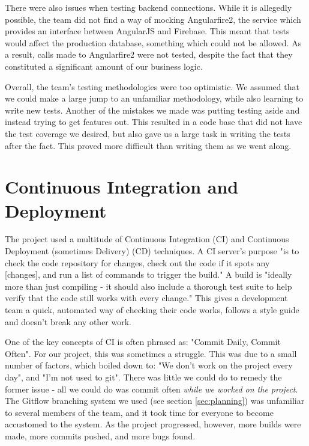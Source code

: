 \documentclass{l3proj}
\begin{document}
There were also issues when testing backend connections. While it is
 allegedly possible, the team did not find a way of mocking Angularfire2, the
 service which provides an interface between AngularJS and Firebase. This meant
 that tests would affect the production database, something which could not be
 allowed. As a result, calls made to Angularfire2 were not tested, despite the
 fact that they constituted a significant amount of our business logic.

Overall, the team's testing methodologies were too optimistic. We assumed that
 we could make a large jump to an unfamiliar methodology, while also learning
 to write new tests. Another of the mistakes we made was putting testing aside
 and instead trying to get features out. This resulted in a code base that did
 not have the test coverage we desired, but also gave us a large task in writing
 the tests after the fact. This proved more difficult than writing them as we
 went along.

\section{Continuous Integration and Deployment} %
\label{sec:cicd}

The project used a multitude of Continuous Integration (CI) and Continuous
 Deployment (sometimes Delivery) (CD) techniques. A CI server's purpose "is to check the code
 repository for changes, check out the code if it spots any [changes], and run a
 list of commands to trigger the build."\cite{meyer2014continuous} A build is "ideally more than just
 compiling - it should also include a thorough test suite to help verify that the code
 still works with every change."\cite{meyer2014continuous} This gives a development
 team a quick, automated way of checking their code works, follows a style guide and
 doesn't break any other work.

One of the key concepts of CI is often phrased as: "Commit Daily,
 Commit Often"\cite{meyer2014continuous}. For our project, this was sometimes a struggle.
 This was due to a small number of factors, which boiled down to: "We don't work on the project
 every day", and "I'm not used to git". There was little we could do to remedy the former issue -
 all we could do was commit often \textit{while we worked on the project}. The Gitflow
 branching system we used (see section \ref{sec:planning}) was unfamiliar to several
 members of the team, and it took time for everyone to become accustomed to the system. As the
 project progressed, however, more builds were made, more commits pushed, and more bugs found.
\end{document}
